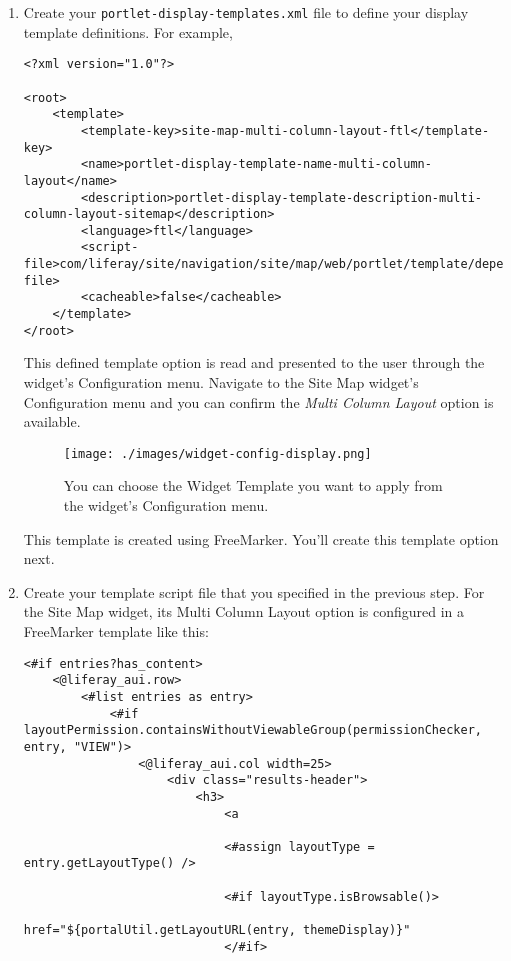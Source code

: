 \begin{enumerate}
  This method returns the XML file containing the display template
  definitions available for your portlet. You'll create this file next.
\item
  Create your \texttt{portlet-display-templates.xml} file to define your
  display template definitions. For example,

\begin{verbatim}
<?xml version="1.0"?>

<root>
    <template>
        <template-key>site-map-multi-column-layout-ftl</template-key>
        <name>portlet-display-template-name-multi-column-layout</name>
        <description>portlet-display-template-description-multi-column-layout-sitemap</description>
        <language>ftl</language>
        <script-file>com/liferay/site/navigation/site/map/web/portlet/template/dependencies/portlet_display_template_multi_column_layout.ftl</script-file>
        <cacheable>false</cacheable>
    </template>
</root>
\end{verbatim}

  This defined template option is read and presented to the user through
  the widget's Configuration menu. Navigate to the Site Map widget's
  Configuration menu and you can confirm the \emph{Multi Column Layout}
  option is available.

  \begin{figure}
  \centering
  \texttt{[image: ./images/widget-config-display.png]}
  \caption{You can choose the Widget Template you want to apply from the
  widget's Configuration menu.}
  \end{figure}

  This template is created using FreeMarker. You'll create this template
  option next.
\item
  Create your template script file that you specified in the previous
  step. For the Site Map widget, its Multi Column Layout option is
  configured in a FreeMarker template like this:

\begin{verbatim}
<#if entries?has_content>
    <@liferay_aui.row>
        <#list entries as entry>
            <#if layoutPermission.containsWithoutViewableGroup(permissionChecker, entry, "VIEW")>
                <@liferay_aui.col width=25>
                    <div class="results-header">
                        <h3>
                            <a

                            <#assign layoutType = entry.getLayoutType() />

                            <#if layoutType.isBrowsable()>
                                href="${portalUtil.getLayoutURL(entry, themeDisplay)}"
                            </#if>


\end{verbatim}
\end{enumerate}

